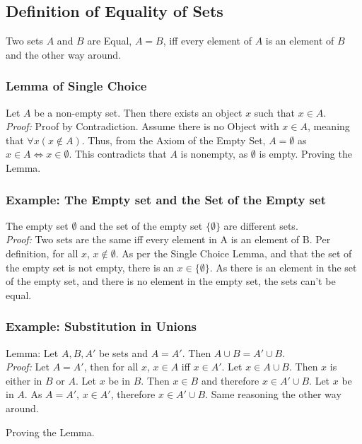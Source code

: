 \subsection{Definition of Equality of Sets}

Two sets $A$ and $B$ are Equal, $A=B$, iff every element of $A$ is an element of $B$ and the other way around.

\subsubsection{Lemma of Single Choice}
Let $A$ be a non-empty set. Then there exists an object $x$ such that $x\in A$.\\
\textit{Proof:} Proof by Contradiction. Assume there is no Object with $x\in A$, meaning that $\forall x(x\notin A)$. Thus, from the Axiom of the Empty Set, $A = \emptyset$ as $x\in A \Leftrightarrow x\in\emptyset$. This contradicts that $A$ is nonempty, as $\emptyset$ is empty. Proving the Lemma.

\subsubsection{Example: The Empty set and the Set of the Empty set}
The empty set $\emptyset$ and the set of the empty set $\{\emptyset\}$ are different sets.\\
\textit{Proof:} Two sets are the same iff every element in A is an element of B. Per definition, for all $x$, $x\notin \emptyset$. As per the Single Choice Lemma, and that the set of the empty set is not empty, there is an $x \in \{\emptyset\}$. As there is an element in the set of the empty set, and there is no element in the empty set, the sets can't be equal.

\subsubsection{Example: Substitution in Unions}
Lemma: Let $A, B, A'$ be sets and $A = A'$. Then $A\cup B = A'\cup B$.\\
\textit{Proof:} Let $A = A'$, then for all $x$, $x\in A$ iff $x\in A'$. Let $x\in A\cup B$. Then $x$ is either in $B$ or $A$. Let $x$ be in $B$. Then $x\in B$ and therefore $x\in A'\cup B$. Let $x$ be in $A$. As $A = A'$, $x\in A'$, therefore $x\in A'\cup B$. Same reasoning the other way around.

Proving the Lemma.

